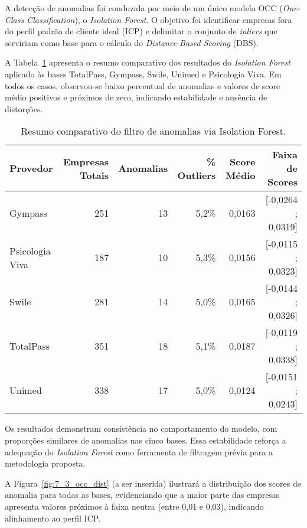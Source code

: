 A detecção de anomalias foi conduzida por meio de um único modelo OCC (\textit{One-Class Classification}), o \textit{Isolation Forest}. O objetivo foi identificar empresas fora do perfil padrão de cliente ideal (ICP) e delimitar o conjunto de \textit{inliers} que serviriam como base para o cálculo do \textit{Distance-Based Scoring} (DBS).

A Tabela~\ref{tab:7_4_occ_all} apresenta o resumo comparativo dos resultados do \textit{Isolation Forest} aplicado às bases TotalPass, Gympass, Swile, Unimed e Psicologia Viva. Em todos os casos, observou-se baixo percentual de anomalias e valores de score médio positivos e próximos de zero, indicando estabilidade e ausência de distorções.

\begin{table}[H]
\centering
\caption{Resumo comparativo do filtro de anomalias via Isolation Forest.}
\label{tab:7_4_occ_all}
\begin{tabular}{lrrrrr}
\toprule
\textbf{Provedor} & \textbf{Empresas Totais} & \textbf{Anomalias} & \textbf{\% Outliers} & \textbf{Score Médio} & \textbf{Faixa de Scores} \\
\midrule
Gympass & 251 & 13 & 5,2\% & 0,0163 & [-0,0264 ; 0,0319] \\
Psicologia Viva & 187 & 10 & 5,3\% & 0,0156 & [-0,0115 ; 0,0323] \\
Swile & 281 & 14 & 5,0\% & 0,0165 & [-0,0144 ; 0,0326] \\
TotalPass & 351 & 18 & 5,1\% & 0,0187 & [-0,0119 ; 0,0338] \\
Unimed & 338 & 17 & 5,0\% & 0,0124 & [-0,0151 ; 0,0243] \\
\bottomrule
\end{tabular}
\end{table}

Os resultados demonstram consistência no comportamento do modelo, com proporções similares de anomalias nas cinco bases. Essa estabilidade reforça a adequação do \textit{Isolation Forest} como ferramenta de filtragem prévia para a metodologia proposta.

A Figura~\ref{fig:7_3_occ_dist} (a ser inserida) ilustrará a distribuição dos scores de anomalia para todas as bases, evidenciando que a maior parte das empresas apresenta valores próximos à faixa neutra (entre 0,01 e 0,03), indicando alinhamento ao perfil ICP.


